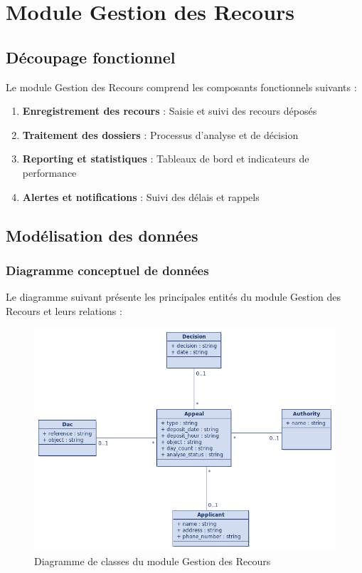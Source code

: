 \section{Module Gestion des Recours}

\subsection{Découpage fonctionnel}
Le module Gestion des Recours comprend les composants fonctionnels suivants :

\begin{enumerate}
    \item \textbf{Enregistrement des recours} : Saisie et suivi des recours déposés
    \item \textbf{Traitement des dossiers} : Processus d'analyse et de décision
    \item \textbf{Reporting et statistiques} : Tableaux de bord et indicateurs de performance
    \item \textbf{Alertes et notifications} : Suivi des délais et rappels
\end{enumerate}

\subsection{Modélisation des données}

\subsubsection{Diagramme conceptuel de données}
Le diagramme suivant présente les principales entités du module Gestion des Recours et leurs relations :

\begin{figure}[H]
    \centering
    \includegraphics[width=\textwidth]{images/diagrammes/class/Diagramme de classe recours.png}
    \caption{Diagramme de classes du module Gestion des Recours}
    \label{fig:class_diagram_recours}
\end{figure}

